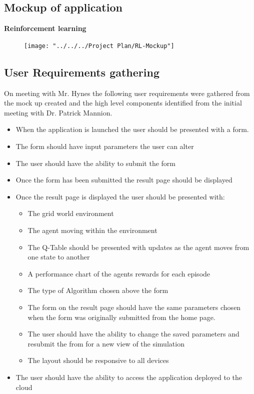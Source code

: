 \subsection {Mockup of application}
\textbf{Reinforcement learning}\\
\begin{figure}[H]
	\centering
	\texttt{[image: "../../../Project Plan/RL-Mockup"]}
	\caption{}
	\label{fig:gridworldenv}
\end{figure}

\subsection {User Requirements gathering}
On meeting with Mr. Hynes the following user requirements were gathered from the mock up created and the high level components identified from the initial meeting with Dr. Patrick Mannion.
\begin{itemize}
	\item When the application is launched the user should be presented with a form.
	\item The form should have input parameters the user can alter
	\item The user should have the ability to submit the form
	\item Once the form has been submitted the result page should be displayed 
	\item Once the result page is displayed the user should be presented with:
	\begin{itemize}
		\item The grid world environment
		\item The agent moving within the environment
		\item The Q-Table should be presented with updates as the agent moves from one state to another
		\item A performance chart of the agents rewards for each episode 
		\item The type of Algorithm chosen above the form 
		\item The form on the result page should have the same parameters chosen when the form was originally submitted from the home page.
		\item The user should have the ability to change the saved parameters and resubmit the from for a new view of the simulation
		\item The layout should be responsive to all devices
		
	\end{itemize}
	\item The user should have the ability to access the application deployed to the cloud 
\end{itemize}
